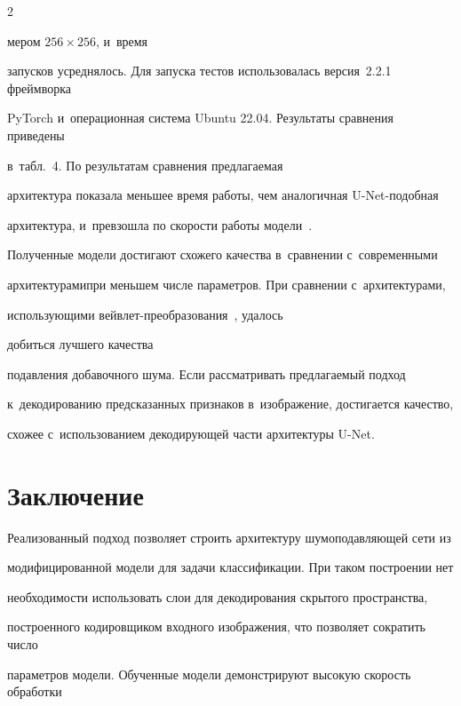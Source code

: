 \begin{multicols}{2}
\noindent


мером $256 \times 256$, и~время 


запусков усреднялось. Для запуска тестов использовалась версия~2.2.1 фреймворка 


PyTorch и~операционная система Ubuntu 22.04. Результаты сравнения приведены 


в~табл.~4. По результатам сравнения предлагаемая 


архитектура показала меньшее время работы, чем аналогичная U-Net-по\-доб\-ная 


архитектура, и~превзошла по ско\-рости работы модели~\cite{MWCNN, MDIWT, WINNet}.








Полученные модели достигают схожего качества в~сравнении с~современными 


архитектурами\linebreak при меньшем чис\-ле па\-ра\-мет\-ров. При сравнении с~архитектурами, 


использующими вейв\-лет-пре\-обра\-зо\-ва\-ния~\cite{MWCNN, MDIWT, WINNet}, удалось 


добиться лучшего качества


подавления до\-ба\-воч\-но\-го шума. Если рассматривать пред\-ла\-га\-емый подход 


к~декодированию пред\-ска\-зан\-ных признаков в~изоб\-ра\-же\-ние, достигается качество, 


схожее с~использованием де\-ко\-ди\-ру\-ющей час\-ти архитектуры U-Net.





\section{Заключение}





Реализованный подход позволяет строить архитектуру шумоподавляющей сети из 


модифицированной модели для задачи классификации. При таком построении нет 


необходимости использовать слои для декодирования скрытого пространства, 


построенного кодировщиком входного изображения, что позволяет сократить число 


параметров модели. Обученные модели демонстрируют высокую скорость обработки 



\end{multicols}
